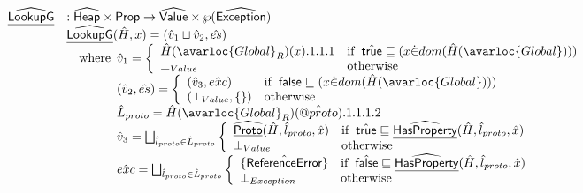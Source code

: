 \[\begin{array}{ll}
\ahf{LookupG} & : \aHeap \times \SF{Prop} \rightarrow \aValue \times \powerset{\abs{Exception}}\\
&
  \ahf{LookupG}(\hat{H},x)
   = (\hat{v}_1\sqcup\hat{v}_2, \hat{es})\\
& \quad\wherec{
  \hat{v}_1 = \left\{
    \begin{array}{ll}
      \hat{H}(\avarloc{Global}_R)(x).1.1.1
      & \ifc{\atrue\sqsubseteq(x \dot{\in} dom(\hat{H}(\avarloc{Global})))} \\
      \bot_{Value}
      & \owc \\
    \end{array}\right. \\
  (\hat{v}_2, \hat{es}) = \left\{
    \begin{array}{ll}
      (\hat{v}_3, \hat{exc})
      & \ifc{\vfalse\sqsubseteq(x \dot{\in} dom(\hat{H}(\avarloc{Global})))}\\
      (\bot_{Value}, \{\})
      & \owc \\
    \end{array}\right. \\
  \hat{L}_{proto} = \hat{H}(\avarloc{Global}_R)(\hat{\varprop{proto}}).1.1.1.2\\
  \hat{v}_3 = 
    \bigsqcup_{\hat{l}_{proto}\in\hat{L}_{proto}}
    \left\{
    \begin{array}{ll}
      \ahf{Proto}(\hat{H}, \hat{l}_{proto}, \hat{x})
      & \ifc{\atrue\sqsubseteq\ahf{HasProperty}(\hat{H},\hat{l}_{proto},\hat{x})}\\
      \bot_{Value}
      & \owc \\
    \end{array}\right. \\
  \hat{exc} = 
    \bigsqcup_{\hat{l}_{proto}\in\hat{L}_{proto}}
    \left\{
    \begin{array}{ll}
      \{\hat{\SF{ReferenceError}}\}
      & \ifc{\afalse\sqsubseteq\ahf{HasProperty}(\hat{H},\hat{l}_{proto},\hat{x})}\\
      \bot_{Exception}
      & \owc \\
    \end{array}\right. \\
}\\
\\


\end{array}\]
